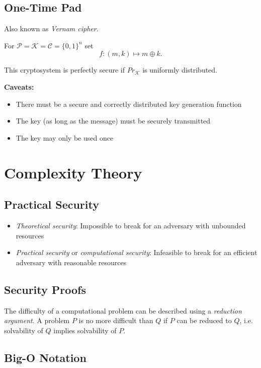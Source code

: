 \documentclass[a4paper]{scrartcl}
\newcommand\cP{\mathcal P}
\newcommand\cC{\mathcal C}
\newcommand\cK{\mathcal K}
\newcommand\Prob{\mathit{Pr}}
\begin{document}
\subsection{One-Time Pad}

Also known as \textit{Vernam cipher}.

For $\cP=\cK=\cC = \{0,1\}^n$ set \[f:(m,k)\mapsto m\oplus k.\]

This cryptosystem is perfectly secure if $\Prob_\cK$ is uniformly distributed.

\textbf{Caveats:}\begin{itemize}
    \item There must be a secure and correctly distributed key generation function
    \item The key (as long as the message) must be securely transmitted
    \item The key may only be used once
\end{itemize}

\section{Complexity Theory}
\subsection{Practical Security}

\begin{itemize}
    \item \textit{Theoretical security}: Impossible to break for an adversary with
        unbounded resources
    \item \textit{Practical security} or \textit{computational security}: Infeasible
        to break for an efficient adversary with reasonable resources
\end{itemize}

\subsection{Security Proofs}

The difficulty of a computational problem can be described using a \textit{reduction
argument}. A problem $P$ is no more difficult than $Q$ if $P$ can be reduced to $Q$,
i.e. solvability of $Q$ implies solvability of $P$.

\subsection{Big-O Notation}
\end{document}
